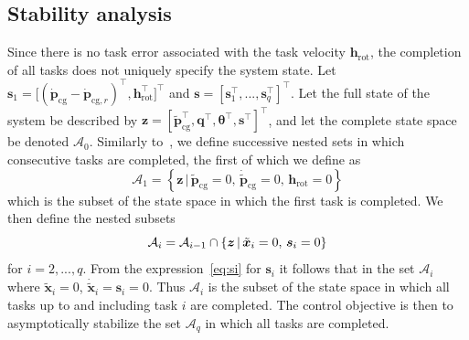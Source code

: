 \documentclass[../main.tex]{subfiles}
\begin{document}
\subsection{Stability analysis}\label{sec:stability}\vspace{-10pt}
%
%
Since there is no task error associated with the task velocity $\bm{h}_{\textrm{rot}}$, the completion of all tasks does not uniquely specify the system state. Let  $\bm{s}_1 = \bigl[\left( \dot{\bm{p}}_{\textrm{cg}} - \dot{\bm{p}}_{\textrm{cg},r} \right)^\top, \bm{h}_{\textrm{rot}}^\top \bigr]^\top$ and $\bm{s} = \left[\bm{s}_1^\top, ..., \bm{s}_q^\top \right]^\top$. Let the full state of the system be described by $\bm{z} = [ \tilde{\bm{p}}_{\textrm{cg}}^\top, \bm{q}^\top, \bm{\theta}^\top, \bm{s}^\top ]^\top$, and let the complete state space be denoted $\mathcal{A}_0$. Similarly to~\cite{Dietrich2020}, we define successive nested sets in which consecutive tasks are completed, the first of which we define as
\begin{equation}
    \mathcal{A}_1 = \left\{ \bm{z} \, | \, \tilde{\bm{p}}_{\textrm{cg}} = 0,\, \dot{\tilde{\bm{p}}}_{\textrm{cg}} = 0,\, \bm{h}_{\textrm{rot}} = 0 \right\}
\end{equation}
which is the subset of the state space in which the first task is completed. We then define the nested subsets
\begin{equation}
    \mathcal{A}_i = \mathcal{A}_{i-1} \cap \left\{ \bm{z} \, | \, \tilde{\bm{x}}_i = 0,\, \bm{s}_i = 0 \right\} \vspace{-1pt}
\end{equation}
for $i=2,...,q$. From the expression~\eqref{eq:si} for $\bm{s}_i$ it follows that in the set $\mathcal{A}_i$ where $\tilde{\bm{x}}_i = 0$, $\dot{\tilde{\bm{x}}}_i =  \bm{s}_i = 0$.  Thus $\mathcal{A}_i$ is the subset of the state space in which all tasks up to and including task $i$ are completed. The control objective is then to asymptotically stabilize the set $\mathcal{A}_q$ in which all tasks are completed. 
\end{document}
